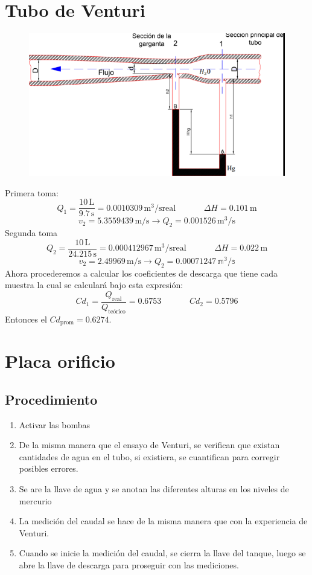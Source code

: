 \documentclass[a4paper,12pt]{report}
\begin{document}
\section{Tubo de Venturi}
\begin{figure}[H]
\centering
\includegraphics[scale=0.5]{ser1.png}
\end{figure}
Primera toma:
$$
Q_{1} = \frac{10\,\mathrm{L}}{9.7\,\mathrm{s}} = 0.0010309 \, \mathrm{m^{3}/s} \mathrm{real} \hspace{40pt} \Delta H = 0.101\,\mathrm{m}
$$
$$
v_{2} = 5.3559439\,\mathrm{m/s} \longrightarrow Q_{2} = 0.001526\,\mathrm{m^{3}/s}
$$
Segunda toma
$$
Q_{2} = \frac{10\,\mathrm{L}}{24.215\,\mathrm{s}} = 0.000412967 \, \mathrm{m^{3}/s} \mathrm{real} \hspace{40pt} \Delta H = 0.022\,\mathrm{m}
$$
$$
v_{2} = 2.49969\,\mathrm{m/s} \longrightarrow Q_{2} = 0.00071247\,\mathbb{m^{3}/s}
$$
Ahora procederemos a calcular los coeficientes de descarga que tiene cada muestra la cual se calculará bajo esta expresión:
$$
Cd_{1} = \frac{Q_{\mathrm{real}}}{Q_{\text{teórico}}} = 0.6753 \hspace{40pt} Cd_{2} = 0.5796
$$
Entonces el $Cd_{\mathrm{prom}} = 0.6274$.
\section{Placa orificio}
\subsection{Procedimiento}
\begin{enumerate}
\item Activar las bombas
\item De la misma manera que el ensayo de Venturi, se verifican que existan cantidades de agua en el tubo, si existiera, se cuantifican para corregir posibles errores.
\item Se are la llave de agua y se anotan las diferentes alturas en los niveles de mercurio
\item La medición del caudal se hace de la misma manera que con la experiencia de Venturi.
\item Cuando se inicie la medición del caudal, se cierra la llave del tanque, luego se abre la llave de descarga para proseguir con las mediciones.
\end{enumerate}
\end{document}
